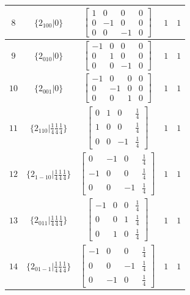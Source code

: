 \documentclass[fleqn,8pt]{jsarticle}
\begin{document}
\begin{longtable}{ccccc}
$ 8 $ & $ \{2{}_{100}|0\} $ & $ \begin{bmatrix} 1 & 0 & 0 & 0 \\ 0 & -1 & 0 & 0 \\ 0 & 0 & -1 & 0 \end{bmatrix} $ & $ 1 $ & $ 1 $ \\ \hline
$ 9 $ & $ \{2{}_{010}|0\} $ & $ \begin{bmatrix} -1 & 0 & 0 & 0 \\ 0 & 1 & 0 & 0 \\ 0 & 0 & -1 & 0 \end{bmatrix} $ & $ 1 $ & $ 1 $ \\ \hline
$ 10 $ & $ \{2{}_{001}|0\} $ & $ \begin{bmatrix} -1 & 0 & 0 & 0 \\ 0 & -1 & 0 & 0 \\ 0 & 0 & 1 & 0 \end{bmatrix} $ & $ 1 $ & $ 1 $ \\ \hline
$ 11 $ & $ \{2{}_{110}|\frac{1}{4} \frac{1}{4} \frac{1}{4}\} $ & $ \begin{bmatrix} 0 & 1 & 0 & \frac{1}{4} \\ 1 & 0 & 0 & \frac{1}{4} \\ 0 & 0 & -1 & \frac{1}{4} \end{bmatrix} $ & $ 1 $ & $ 1 $ \\ \hline
$ 12 $ & $ \{2{}_{1-10}|\frac{1}{4} \frac{1}{4} \frac{1}{4}\} $ & $ \begin{bmatrix} 0 & -1 & 0 & \frac{1}{4} \\ -1 & 0 & 0 & \frac{1}{4} \\ 0 & 0 & -1 & \frac{1}{4} \end{bmatrix} $ & $ 1 $ & $ 1 $ \\ \hline
$ 13 $ & $ \{2{}_{011}|\frac{1}{4} \frac{1}{4} \frac{1}{4}\} $ & $ \begin{bmatrix} -1 & 0 & 0 & \frac{1}{4} \\ 0 & 0 & 1 & \frac{1}{4} \\ 0 & 1 & 0 & \frac{1}{4} \end{bmatrix} $ & $ 1 $ & $ 1 $ \\ \hline
$ 14 $ & $ \{2{}_{01-1}|\frac{1}{4} \frac{1}{4} \frac{1}{4}\} $ & $ \begin{bmatrix} -1 & 0 & 0 & \frac{1}{4} \\ 0 & 0 & -1 & \frac{1}{4} \\ 0 & -1 & 0 & \frac{1}{4} \end{bmatrix} $ & $ 1 $ & $ 1 $ \\ \hline

\end{longtable}
\end{document}
